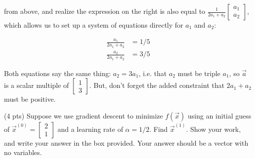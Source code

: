 \documentclass[11pt]{article}
\begin{document}
\begin{prob}
\begin{subprob}
\begin{solution}
from above, and realize the expression on the right is also equal to $\frac{1}{2a_1+a_2} \begin{bmatrix}a_1\\a_2\end{bmatrix}$, which allows us to set up a system of equations directly for $a_1$ and $a_2$:

\begin{align*}
\frac{a_1}{2a_1+a_2} &= 1/5 \\
\frac{a_2}{2a_1+a_2} &= 3/5
\end{align*}

Both equations say the same thing: $a_2 = 3a_1$, i.e. that $a_2$ must be triple $a_1$, so $\vec a$ is a scalar multiple of $\begin{bmatrix}1\\3\end{bmatrix}$. But, don't forget the added constraint that $2a_1 + a_2$ must be positive.

\end{solution}
\end{subprob}

\vspace{0.5in}

\begin{subprob}(4 pts)
Suppose we use gradient descent to minimize $f(\vec x)$ using an initial guess of $\vec x^{(0)} = \begin{bmatrix} 2 \\ 1 \end{bmatrix}$ and a learning rate of $\alpha = 1/2$. Find $\vec x^{(1)}$. Show your work, and write your answer in the box provided. Your answer should be a vector with no variables. \\


\end{subprob}
\end{prob}
\end{document}
